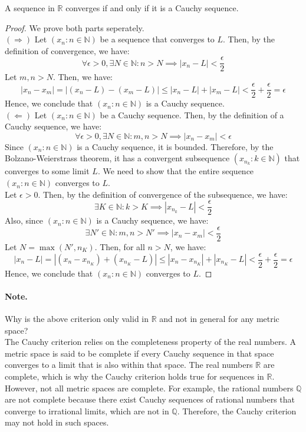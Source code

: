 \documentclass[openany]{book}
\numberwithin{equation}{section}
\begin{document}
    A sequence in $\mathbb{R}$ converges if and only if it is a Cauchy sequence.
\par
\begin{proof}
    We prove both parts seperately. \\
    $(\Rightarrow)$ Let $(x_n : n \in \mathbb{N})$ be a sequence that converges to $L$. Then, by the definition of convergence, we have:
    $$\forall \epsilon > 0, \exists N \in \mathbb{N}: n > N \implies |x_n - L| < \frac{\epsilon}{2}$$
    Let $m,n > N$. Then, we have:
    $$|x_n - x_m| = |(x_n - L) - (x_m - L)| \leq |x_n - L| + |x_m - L| < \frac{\epsilon}{2} + \frac{\epsilon}{2} = \epsilon$$
    Hence, we conclude that $(x_n : n \in \mathbb{N})$ is a Cauchy sequence. \\
    $(\Leftarrow)$ Let $(x_n : n \in \mathbb{N})$ be a Cauchy sequence. Then, by the definition of a Cauchy sequence, we have:
    $$\forall \epsilon > 0, \exists N \in \mathbb{N}: m,n > N \implies |x_n - x_m| < \epsilon$$
    Since $(x_n : n \in \mathbb{N})$ is a Cauchy sequence, it is bounded. Therefore, by the Bolzano-Weierstrass theorem, it has a convergent subsequence $(x_{n_k} : k \in \mathbb{N})$ that converges to some limit $L$. We need to show that the entire sequence $(x_n : n \in \mathbb{N})$ converges to $L$. \\
    Let $\epsilon > 0$. Then, by the definition of convergence of the subsequence, we have:
    $$\exists K \in \mathbb{N}: k > K \implies |x_{n_k} - L| < \frac{\epsilon}{2}$$
    Also, since $(x_n : n \in \mathbb{N})$ is a Cauchy sequence, we have:
    $$\exists N' \in \mathbb{N}: m,n > N' \implies |x_n - x_m| < \frac{\epsilon}{2}$$
    Let $N = \max(N', n_K)$. Then, for all $n > N$, we have:
    $$|x_n - L| = |(x_n - x_{n_K}) + (x_{n_K} - L)| \leq |x_n - x_{n_K}| + |x_{n_K} - L| < \frac{\epsilon}{2} + \frac{\epsilon}{2} = \epsilon$$
    Hence, we conclude that $(x_n : n \in \mathbb{N})$ converges to $L$.
\end{proof}
\paragraph{Note.}

Why is the above criterion only valid in $\mathbb{R}$ and not in general for any metric space? \\
    The Cauchy criterion relies on the completeness property of the real numbers. A metric space is said to be complete if every Cauchy sequence in that space converges to a limit that is also within that space. The real numbers $\mathbb{R}$ are complete, which is why the Cauchy criterion holds true for sequences in $\mathbb{R}$. However, not all metric spaces are complete. For example, the rational numbers $\mathbb{Q}$ are not complete because there exist Cauchy sequences of rational numbers that converge to irrational limits, which are not in $\mathbb{Q}$. Therefore, the Cauchy criterion may not hold in such spaces.
\par
\end{document}
